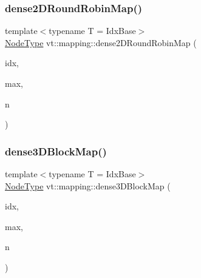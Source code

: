 \subsubsection{\texorpdfstring{dense2\+D\+Round\+Robin\+Map()}{dense2DRoundRobinMap()}}
{\footnotesize\ttfamily template$<$typename T  = Idx\+Base$>$ \\
\hyperlink{namespacevt_a866da9d0efc19c0a1ce79e9e492f47e2}{Node\+Type} vt\+::mapping\+::dense2\+D\+Round\+Robin\+Map (\begin{DoxyParamCaption}\item[{\hyperlink{namespacevt_1_1mapping_a6832cbb1361fe72fd7ec730e7b7773b3}{Idx2\+D\+Ptr}$<$ T $>$}]{idx,  }\item[{\hyperlink{namespacevt_1_1mapping_a6832cbb1361fe72fd7ec730e7b7773b3}{Idx2\+D\+Ptr}$<$ T $>$}]{max,  }\item[{\hyperlink{namespacevt_a866da9d0efc19c0a1ce79e9e492f47e2}{Node\+Type}}]{n }\end{DoxyParamCaption})}

\mbox{\label{namespacevt_1_1mapping_a91764d84e5e6d8253872740cb8424726}} 
\subsubsection{\texorpdfstring{dense3\+D\+Block\+Map()}{dense3DBlockMap()}}
{\footnotesize\ttfamily template$<$typename T  = Idx\+Base$>$ \\
\hyperlink{namespacevt_a866da9d0efc19c0a1ce79e9e492f47e2}{Node\+Type} vt\+::mapping\+::dense3\+D\+Block\+Map (\begin{DoxyParamCaption}\item[{\hyperlink{namespacevt_1_1mapping_aacc737158b6517f2d760ffc8d1b5abca}{Idx3\+D\+Ptr}$<$ T $>$}]{idx,  }\item[{\hyperlink{namespacevt_1_1mapping_aacc737158b6517f2d760ffc8d1b5abca}{Idx3\+D\+Ptr}$<$ T $>$}]{max,  }\item[{\hyperlink{namespacevt_a866da9d0efc19c0a1ce79e9e492f47e2}{Node\+Type}}]{n }\end{DoxyParamCaption})}

\mbox{\label{namespacevt_1_1mapping_aa48fa3b830b637787c584dbac5bba6db}} 
